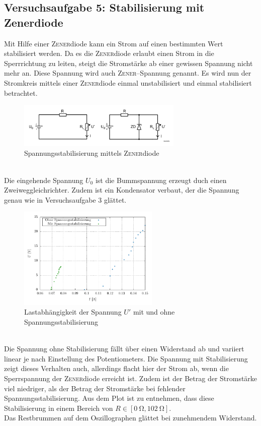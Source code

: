 \documentclass[a4paper,10pt]{article}
\numberwithin{equation}{section}
\begin{document}
\subsection{Versuchsaufgabe 5: Stabilisierung mit Zenerdiode}
Mit Hilfe einer \textsc{Zener}diode kann ein Strom auf einen bestimmten Wert stabilisiert werden.
Da es die \textsc{Zener}diode erlaubt einen Strom in die Sperrrichtung zu leiten, steigt die Stromstärke ab einer gewissen Spannung nicht mehr an.
Diese Spannung wird auch \textsc{Zener}--Spannung genannt.
Es wird nun der Stromkreis mittels einer \textsc{Zener}diode einmal unstabilisiert und einmal stabilisiert betrachtet.
\begin{figure}[h]
        \centering
        \includegraphics[width=0.7\textwidth]{spannungsstabilisierung.png}
        \caption{Spannungsstabilisierung mittels \textsc{Zener}diode}
\end{figure}\\
Die eingehende Spannung $U_0$ ist die Bummspannung erzeugt duch einen Zweiweggleichrichter.
Zudem ist ein Kondensator verbaut, der die Spannung genau wie in Versuchsaufgabe 3 glättet.
\begin{figure}[h]
        \centering
        \includegraphics[width=0.6\textwidth]{plot/5_beides_crop.pdf}
        \caption{Lastabhängigkeit der Spannung $U'$ mit und ohne Spannungsstabilisierung}
\end{figure}\\
Die Spannung ohne Stabilisierung fällt über einen Widerstand ab und variiert linear je nach Einstellung des Potentiometers.
Die Spannung mit Stabilisierung zeigt dieses Verhalten auch, allerdings flacht hier der Strom ab, wenn die Sperrspannung der \textsc{Zener}diode erreicht ist.
Zudem ist der Betrag der Stromstärke viel niedriger, als der Betrag der Stromstärke bei fehlender Spannungsstabilisierung.
Aus dem Plot ist zu entnehmen, dass diese Stabilisierung in einem Bereich von $R \in \left[\SI{0}{\ohm},\SI{102}{\ohm}\right]$.
\\\indent Das Restbrummen auf dem Oszillographen glättet bei zunehmendem Widerstand. 
\end{document}
